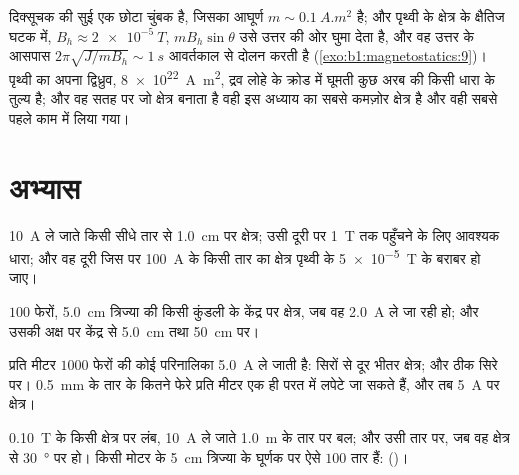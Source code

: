 \begin{example}[दिक्सूचक और पृथ्वी]\label{ex:b1:magnetostatics:compass}
दिक्सूचक की सुई एक छोटा चुंबक है, जिसका आघूर्ण $m \sim \qty{0.1}{A.m^2}$ है;
और पृथ्वी के क्षेत्र के क्षैतिज घटक में, $B_h \approx \qty{2e-5}{T}$,
 $mB_h\sin\theta$ उसे उत्तर की ओर घुमा देता है, और वह उत्तर के आसपास
$2\pi\sqrt{J/mB_h} \sim \qty{1}{s}$ आवर्तकाल से दोलन करती है (\cref{exo:b1:magnetostatics:9})।
पृथ्वी का अपना द्विध्रुव, \qty{8e22}{A.m^2}, द्रव लोहे के क्रोड में घूमती
कुछ अरब  की किसी धारा के तुल्य है; और वह सतह पर जो क्षेत्र बनाता है
वही इस अध्याय का सबसे कमज़ोर क्षेत्र है और वही सबसे पहले काम में लिया गया।
\end{example}

\section{अभ्यास}

\begin{exercise}[$\star$]\label{exo:b1:magnetostatics:1}
\qty{10}{A} ले जाते किसी सीधे तार से \qty{1.0}{cm} पर क्षेत्र; उसी दूरी पर
\qty{1}{T} तक पहुँचने के लिए आवश्यक धारा; और वह दूरी जिस पर \qty{100}{A} के
किसी तार का क्षेत्र पृथ्वी के \qty{5e-5}{T} के बराबर हो जाए।
\end{exercise}

\begin{exercise}[$\star$]\label{exo:b1:magnetostatics:2}
$100$ फेरों, \qty{5.0}{cm} त्रिज्या की किसी कुंडली के केंद्र पर क्षेत्र, जब
वह \qty{2.0}{A} ले जा रही हो; और उसकी अक्ष पर केंद्र से \qty{5.0}{cm} तथा
\qty{50}{cm} पर।
\end{exercise}

\begin{exercise}[$\star$]\label{exo:b1:magnetostatics:3}
प्रति मीटर $1000$ फेरों की कोई परिनालिका \qty{5.0}{A} ले जाती है: सिरों से
दूर भीतर क्षेत्र; और ठीक सिरे पर। \qty{0.5}{mm} के तार के कितने फेरे प्रति
मीटर एक ही परत में लपेटे जा सकते हैं, और तब \qty{5}{A} पर क्षेत्र।
\end{exercise}

\begin{exercise}[$\star$]\label{exo:b1:magnetostatics:4}
\qty{0.10}{T} के किसी क्षेत्र पर लंब, \qty{10}{A} ले जाते \qty{1.0}{m} के
तार पर बल; और उसी तार पर, जब वह क्षेत्र से \qty{30}{\degree} पर हो। किसी
मोटर के \qty{5}{cm} त्रिज्या के घूर्णक पर ऐसे $100$ तार हैं: 
()।
\end{exercise}

